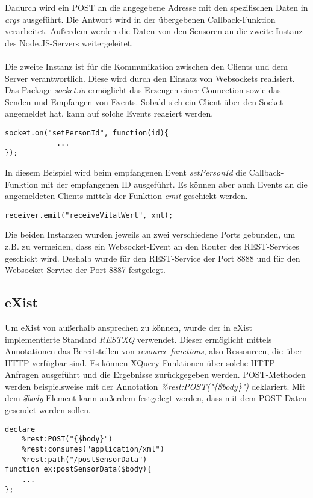 Dadurch wird ein POST an die angegebene Adresse mit den spezifischen Daten in \textit{args} ausgeführt. Die Antwort wird in der übergebenen Callback-Funktion verarbeitet. Außerdem  werden die Daten von den Sensoren an die zweite Instanz des Node.JS-Servers weitergeleitet.
\\
\\
Die zweite Instanz ist für die Kommunikation zwischen den Clients und dem Server verantwortlich. Diese wird durch den Einsatz von Websockets realisiert. Das Package \textit{socket.io} ermöglicht das Erzeugen einer Connection sowie das Senden und Empfangen von Events. Sobald sich ein Client über den Socket angemeldet hat, kann auf solche Events reagiert werden.

\begin{lstlisting}
socket.on("setPersonId", function(id){
            ...
});
\end{lstlisting}

In diesem Beispiel wird beim empfangenen Event \textit{setPersonId} die Callback-Funktion mit der empfangenen ID ausgeführt. Es können aber auch Events an die angemeldeten Clients mittels der Funktion \textit{emit} geschickt werden.

\begin{lstlisting}
receiver.emit("receiveVitalWert", xml);
\end{lstlisting}

Die beiden Instanzen wurden jeweils an zwei verschiedene Ports gebunden, um z.B. zu vermeiden, dass ein Websocket-Event an den Router des REST-Services geschickt wird. Deshalb wurde für den REST-Service der Port 8888 und für den Websocket-Service der Port 8887 festgelegt.

\subsection{eXist}
Um eXist von außerhalb ansprechen zu können, wurde der in eXist implementierte Standard \textit{RESTXQ} verwendet. Dieser ermöglicht mittels Annotationen das Bereitstellen von \textit{resource functions}, also Ressourcen, die über HTTP verfügbar sind. Es können XQuery-Funktionen über solche HTTP-Anfragen ausgeführt und die Ergebnisse zurückgegeben werden. POST-Methoden werden beispielsweise mit der Annotation \textit{\%rest:POST("\{\$body\}")} deklariert. Mit dem \textit{\$body} Element kann außerdem festgelegt werden, dass mit dem POST Daten gesendet werden sollen.

\begin{lstlisting}
declare
    %rest:POST("{$body}")
    %rest:consumes("application/xml")
    %rest:path("/postSensorData")
function ex:postSensorData($body){
    ...
};
\end{lstlisting}

